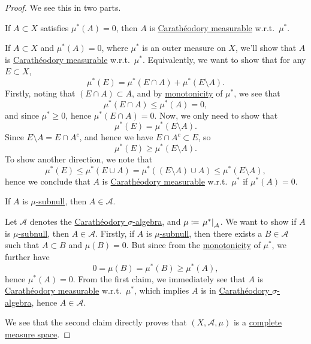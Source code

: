 \begin{proof}
	We see this in two parts.
	\begin{claim}
		If \(A\subset X\) satisfies \(\mu ^{\ast} (A) = 0\), then \(A\) is \hyperref[def:C-measurable]{Carathéodory measurable} w.r.t.\ \(\mu ^{\ast} \).
	\end{claim}
	\begin{explanation}
		If \(A\subset X\) and \(\mu^{\ast} (A) = 0\), where \(\mu^{\ast} \) is an outer measure on \(X\), we'll show that \(A\) is \hyperref[def:C-measurable]{Carathéodory measurable} w.r.t.\ \(\mu^{\ast} \). Equivalently, we want to show that for any \(E\subset X\),
		\[
			\mu^{\ast} (E) = \mu^{\ast} (E\cap A) + \mu^{\ast} (E \setminus A).
		\]
		Firstly, noting that \((E\cap A)\subset A\), and by \hyperref[def:outer-measure-montonicity]{monotonicity} of \(\mu^{\ast} \), we see that
		\[
			\mu^{\ast} (E\cap A)\leq \mu^{\ast} (A) = 0,
		\]
		and since \(\mu^{\ast} \geq 0\), hence \(\mu^{\ast} (E\cap A) = 0\). Now, we only need to show that
		\[
			\mu^{\ast} (E) = \mu^{\ast} (E\setminus A).
		\]
		Since \(E\setminus A = E\cap A^{c} \), and hence we have \(E\cap A^{c} \subset E\), so
		\[
			\mu^{\ast} (E)\geq \mu^{\ast} (E\setminus A).
		\]
		To show another direction, we note that
		\[
			\mu^{\ast} (E)\leq \mu^{\ast} (E\cup A) = \mu^{\ast} ((E\setminus A) \cup A) \leq \mu^{\ast} (E\setminus A),
		\]
		hence we conclude that \(A\) is \hyperref[def:C-measurable]{Carathéodory measurable} w.r.t.\ \(\mu^{\ast} \) if \(\mu^{\ast} (A)=0\).
	\end{explanation}

	\begin{claim}
		If \(A\) is \hyperref[def:subnull-set]{\(\mu\)-subnull}, then \(A\in \mathcal{A} \).
	\end{claim}
	\begin{explanation}
		Let \(\mathcal{A} \) denotes the \hyperref[thm:Caratheodory-extension]{Carathéodory \(\sigma\)-algebra}, and \(\mu\coloneqq \left.\mu^{\ast} \right\vert_{\mathcal{A} }^{} \). We want to show if
		\(A\) is \hyperref[def:subnull-set]{\(\mu\)-subnull}, then \(A\in\mathcal{A} \). Firstly, if \(A\) is \hyperref[def:subnull-set]{\(\mu \)-subnull}, then there exists a \(B\in \mathcal{A} \) such that \(A\subset B\) and \(\mu (B) = 0\). But since from
		the \hyperref[def:outer-measure-montonicity]{monotonicity} of \(\mu ^{\ast} \), we further have
		\[
			0 = \mu(B) = \mu ^{\ast} (B) \geq \mu ^{\ast} (A),
		\]
		hence \(\mu ^{\ast} (A) = 0\). From the first claim, we immediately see that \(A\) is \hyperref[def:C-measurable]{Carathéodory measurable} w.r.t.\ \(\mu ^{\ast}\),
		which implies \(A\) is in \hyperref[thm:Caratheodory-extension]{Carathéodory \(\sigma\)-algebra}, hence \(A\in \mathcal{A} \).
	\end{explanation}

	We see that the second claim directly proves that \((X, \mathcal{A} , \mu )\) is a \hyperref[def:complete-measure-space]{complete measure space}.
\end{proof}

